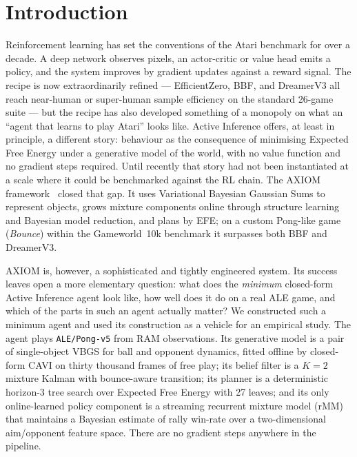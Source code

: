 \documentclass[runningheads]{llncs}
\begin{document}
\section{Introduction}\label{sec:intro}

Reinforcement learning has set the conventions of the Atari benchmark
for over a decade. A deep network observes pixels, an actor-critic or
value head emits a policy, and the system improves by gradient updates
against a reward signal. The recipe is now extraordinarily refined ---
EfficientZero, BBF, and DreamerV3 all reach near-human or super-human
sample efficiency on the standard 26-game suite --- but the recipe has
also developed something of a monopoly on what an ``agent that learns
to play Atari'' looks like. Active Inference offers, at least in
principle, a different story: behaviour as the consequence of
minimising Expected Free Energy under a generative model of the world,
with no value function and no gradient steps required. Until recently
that story had not been instantiated at a scale where it could be
benchmarked against the RL chain. The AXIOM
framework~\cite{ref_axiom} closed that gap. It uses Variational
Bayesian Gaussian Sums to represent objects, grows mixture components
online through structure learning and Bayesian model reduction, and
plans by EFE; on a custom Pong-like game (\emph{Bounce}) within the
Gameworld~10k benchmark it surpasses both BBF and DreamerV3.

AXIOM is, however, a sophisticated and tightly engineered system. Its
success leaves open a more elementary question: what does the
\emph{minimum} closed-form Active Inference agent look like, how well
does it do on a real ALE game, and which of the parts in such an
agent actually matter? We constructed such a minimum agent and used
its construction as a vehicle for an empirical study. The agent
plays \texttt{ALE/Pong-v5} from RAM observations. Its generative
model is a pair of single-object VBGS for ball and opponent
dynamics, fitted offline by closed-form CAVI on thirty thousand
frames of free play; its belief filter is a $K{=}2$ mixture Kalman
with bounce-aware transition; its planner is a deterministic
horizon-3 tree search over Expected Free Energy with 27 leaves; and
its only online-learned policy component is a streaming recurrent
mixture model (rMM) that maintains a Bayesian estimate of rally
win-rate over a two-dimensional aim/opponent feature space. There
are no gradient steps anywhere in the pipeline.
\end{document}

